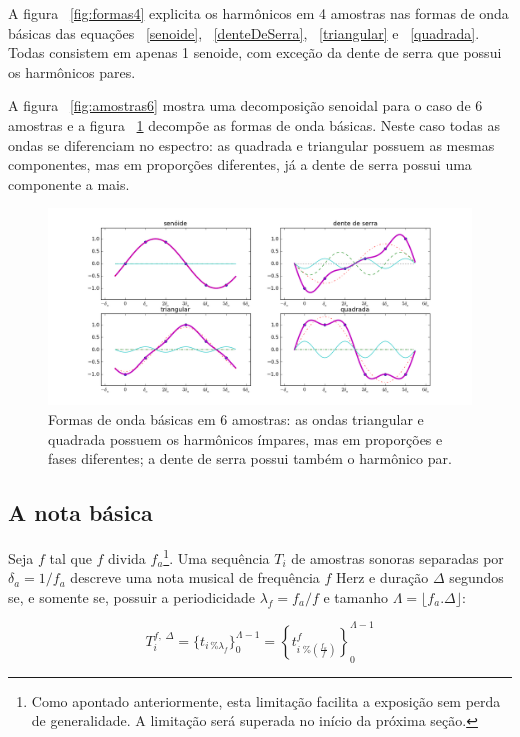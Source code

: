 A figura ~\ref{fig:formas4} explicita os harmônicos em 4 amostras nas formas de onda básicas das equações ~\ref{senoide}, ~\ref{denteDeSerra}, ~\ref{triangular} e ~\ref{quadrada}. Todas consistem em apenas 1 senoide, com exceção da dente de serra que possui os harmônicos pares.


A figura ~\ref{fig:amostras6} mostra uma decomposição senoidal para o caso de 6 amostras e a figura ~\ref{fig:formas6} decompõe as formas de onda básicas.
 Neste caso todas as ondas se diferenciam no espectro: as quadrada e triangular possuem as mesmas componentes, mas em proporções diferentes, já a dente de serra possui uma componente a mais.

\begin{figure}[h!]
    \centering
        \includegraphics[width=\textwidth]{figuras/amostras6formas___}
    \caption{Formas de onda básicas em 6 amostras: as ondas triangular e quadrada possuem os harmônicos ímpares, mas em proporções e fases diferentes; a dente de serra possui também o harmônico par.}
        \label{fig:formas6}
\end{figure}



\subsection{A nota básica}\label{notaBasica}

Seja $f$ tal que $f$ divida $f_a$\footnote{Como apontado anteriormente, esta limitação facilita a exposição sem perda de generalidade.
A limitação será superada no início da próxima seção.}.
Uma sequência $T_i$ de amostras sonoras separadas por $\delta_a=1/f_a$ descreve uma nota musical de frequência $f$ Herz e duração $\Delta$ segundos se, e somente se, possuir a periodicidade $\lambda_f=f_a/f$
 e tamanho $\Lambda=\lfloor f_a . \Delta \rfloor $:

\begin{equation}\label{eq:notaBasica}
T_i^{f,\; \Delta}=\{t_{i \, \% \lambda_f} \}_0^{\Lambda-1}= \left \{t^f_{i \; \% \left( \frac{f_a}{f} \right) } \right \}_0^{\Lambda-1}
\end{equation}

